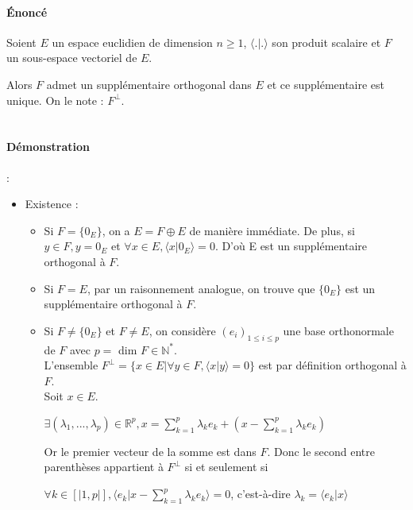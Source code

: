 \documentclass{article}
\begin{document}
\paragraph{\uppercase{é}noncé}
Soient $E$ un espace euclidien de dimension $n \geq 1$, $\langle .| .\rangle$ son produit scalaire et $F$ un sous-espace vectoriel de $E$.

Alors $F$ admet un supplémentaire orthogonal dans $E$ et ce supplémentaire est unique. On le note : $F^{\perp}$.
 \\
 \\
\paragraph{Démonstration} :

\begin{itemize}

\item Existence :

\begin{itemize}

\item Si $F = \{0_E\}$, on a $E = F \oplus E$ de manière immédiate. De plus, si $y \in F, y = 0_E$ et $\forall x \in E, \langle x|0_E \rangle = 0 $. D'où E est un supplémentaire orthogonal à $F$. \\

\item Si $F = E$, par un raisonnement analogue, on trouve que $\{0_E\}$ est un supplémentaire orthogonal à $F$. \\

\item Si $F \neq \{0_E\}$ et $F \neq E$, on considère $(e_i)_{1\leq{}i\leq{}p}$ une base orthonormale de $F$ avec $p =$ dim $F \in \mathbb{N}^{*}.$ \\

L'ensemble $F^{\perp} = \{ x \in E | \forall y \in F, \langle x|y \rangle = 0 \}$ est par définition orthogonal à $F$. \\

Soit $x \in E$.

$\exists (\lambda{}_{1}, ..., \lambda{}_{p}) \in \mathbb{R}^p , x =\displaystyle \sum_{k = 1}^{p} \lambda{}_{k}e_k + (x - \sum_{k = 1}^{p} \lambda{}_{k}e_k)$

Or le premier vecteur de la somme est dans $F$. Donc le second entre parenthèses appartient à $F^{\perp}$ si et seulement si 

$\displaystyle \forall k \in [|1,p|], \langle e_k | x -\displaystyle \sum_{k = 1}^{p}\lambda{}_{k}e_k \rangle = 0$, c'est-à-dire $\lambda_{k} = \langle e_k | x \rangle$


\end{itemize}
\end{itemize}
\end{document}
